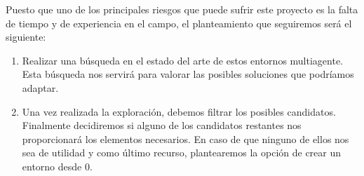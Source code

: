 Puesto que uno de los principales riesgos que puede sufrir este proyecto es la falta de tiempo y de experiencia en el campo, el planteamiento que seguiremos será el siguiente:
\begin{enumerate}
    \item Realizar una búsqueda en el estado del arte de estos entornos multiagente. Esta búsqueda nos servirá para valorar las posibles soluciones que podríamos adaptar.
    \item Una vez realizada la exploración, debemos filtrar los posibles candidatos. Finalmente decidiremos si alguno de los candidatos restantes nos proporcionará los elementos necesarios. En caso de que ninguno de ellos nos sea de utilidad y como último recurso, plantearemos la opción de crear un entorno desde 0.  
\end{enumerate}

